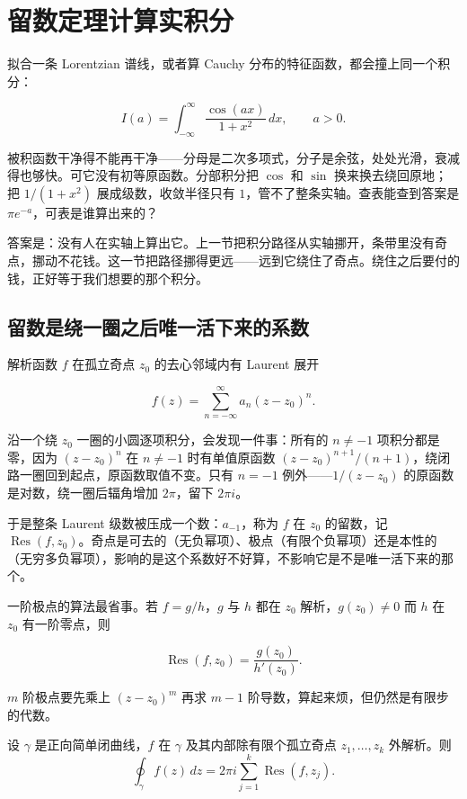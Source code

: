 \section{留数定理计算实积分}
\label{sec:08-Numerical-Analysis/09-Complex-Analysis-and-Residues/02}

拟合一条 Lorentzian 谱线，或者算 Cauchy 分布的特征函数，都会撞上同一个积分：

\[
I(a)=\int_{-\infty}^{\infty}\frac{\cos(ax)}{1+x^2}\,dx,\qquad a>0 .
\]

被积函数干净得不能再干净——分母是二次多项式，分子是余弦，处处光滑，衰减得也够快。可它没有初等原函数。分部积分把 \(\cos\) 和 \(\sin\) 换来换去绕回原地；把 \(1/(1+x^2)\) 展成级数，收敛半径只有 \(1\)，管不了整条实轴。查表能查到答案是 \(\pi e^{-a}\)，可表是谁算出来的？

答案是：没有人在实轴上算出它。上一节把积分路径从实轴挪开，条带里没有奇点，挪动不花钱。这一节把路径挪得更远——远到它绕住了奇点。绕住之后要付的钱，正好等于我们想要的那个积分。

\subsection{留数是绕一圈之后唯一活下来的系数}

解析函数 \(f\) 在孤立奇点 \(z_0\) 的去心邻域内有 Laurent 展开

\[
f(z)=\sum_{n=-\infty}^{\infty}a_n(z-z_0)^n .
\]

沿一个绕 \(z_0\) 一圈的小圆逐项积分，会发现一件事：所有的 \(n\ne -1\) 项积分都是零，因为 \((z-z_0)^n\) 在 \(n\ne-1\) 时有单值原函数 \((z-z_0)^{n+1}/(n+1)\)，绕闭路一圈回到起点，原函数取值不变。只有 \(n=-1\) 例外——\(1/(z-z_0)\) 的原函数是对数，绕一圈后辐角增加 \(2\pi\)，留下 \(2\pi i\)。

于是整条 Laurent 级数被压成一个数：\(a_{-1}\)，称为 \(f\) 在 \(z_0\) 的留数，记 \(\operatorname{Res}(f,z_0)\)。奇点是可去的（无负幂项）、极点（有限个负幂项）还是本性的（无穷多负幂项），影响的是这个系数好不好算，不影响它是不是唯一活下来的那个。

一阶极点的算法最省事。若 \(f=g/h\)，\(g\) 与 \(h\) 都在 \(z_0\) 解析，\(g(z_0)\ne0\) 而 \(h\) 在 \(z_0\) 有一阶零点，则

\[
\operatorname{Res}(f,z_0)=\frac{g(z_0)}{h'(z_0)} .
\]

\(m\) 阶极点要先乘上 \((z-z_0)^m\) 再求 \(m-1\) 阶导数，算起来烦，但仍然是有限步的代数。

\begin{theorem}
设 \(\gamma\) 是正向简单闭曲线，\(f\) 在 \(\gamma\) 及其内部除有限个孤立奇点 \(z_1,\dots,z_k\) 外解析。则
\[
\oint_\gamma f(z)\,dz=2\pi i\sum_{j=1}^{k}\operatorname{Res}(f,z_j).
\]
\end{theorem}

